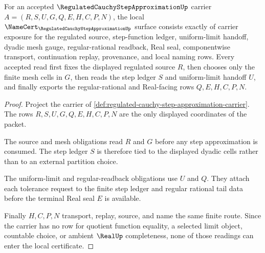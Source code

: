\begin{theorem}
\label{thm:regulated-cauchy-step-approximation-namecert-obligations}
For an accepted $\RegulatedCauchyStepApproximationUp$ carrier $A=(R,S,U,G,Q,E,H,C,P,N)$, the local $\NameCert_{\RegulatedCauchyStepApproximationUp}$ surface consists exactly of carrier exposure for the regulated source, step-function ledger, uniform-limit handoff, dyadic mesh gauge, regular-rational readback, Real seal, componentwise transport, continuation replay, provenance, and local naming rows. Every accepted read first fixes the displayed regulated source $R$, then chooses only the finite mesh cells in $G$, then reads the step ledger $S$ and uniform-limit handoff $U$, and finally exports the regular-rational and Real-facing rows $Q,E,H,C,P,N$.
\end{theorem}
\begin{proof}
Project the carrier of \autoref{def:regulated-cauchy-step-approximation-carrier}. The rows $R,S,U,G,Q,E,H,C,P,N$ are the only displayed coordinates of the packet.

The source and mesh obligations read $R$ and $G$ before any step approximation is consumed. The step ledger $S$ is therefore tied to the displayed dyadic cells rather than to an external partition choice.

The uniform-limit and regular-readback obligations use $U$ and $Q$. They attach each tolerance request to the finite step ledger and regular rational tail data before the terminal Real seal $E$ is available.

Finally $H,C,P,N$ transport, replay, source, and name the same finite route. Since the carrier has no row for quotient function equality, a selected limit object, countable choice, or ambient $\RealUp$ completeness, none of those readings can enter the local certificate.
\end{proof}

